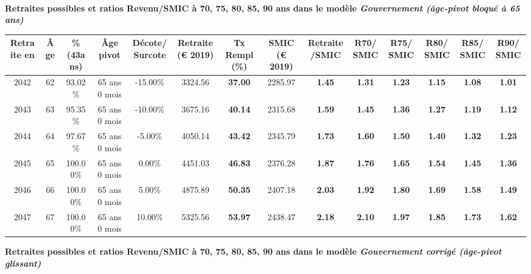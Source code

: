  ~\\{\bf \noindent Retraites possibles et ratios Revenu/SMIC à 70, 75, 80, 85, 90 ans dans le modèle \emph{Gouvernement (âge-pivot bloqué à 65 ans)}}  
 
\begin{adjustbox}{max width=\textwidth} 
\begin{tabular}[htb]{|c|c||c|c|c||c|c||c|c||c|c|c|c|c|} 
\hline 
 Retraite en &  Âge &  \%(43ans) &  Âge pivot &  Décote/Surcote &  Retraite (\euro{} 2019) &  Tx Rempl(\%) &  SMIC (\euro{} 2019) &  Retraite/SMIC &  R70/SMIC &  R75/SMIC &  R80/SMIC &  R85/SMIC &  R90/SMIC \\ 
\hline \hline 
 2042 &  62 &  93.02\% &  65 ans 0 mois &  -15.00\% &  3324.56 &  {\bf 37.00} &  2285.97 &  {\bf 1.45} &  {\bf 1.31} &  {\bf 1.23} &  {\bf 1.15} &  {\bf 1.08} &  {\bf 1.01} \\ 
\hline 
 2043 &  63 &  95.35\% &  65 ans 0 mois &  -10.00\% &  3675.16 &  {\bf 40.14} &  2315.68 &  {\bf 1.59} &  {\bf 1.45} &  {\bf 1.36} &  {\bf 1.27} &  {\bf 1.19} &  {\bf 1.12} \\ 
\hline 
 2044 &  64 &  97.67\% &  65 ans 0 mois &  -5.00\% &  4050.14 &  {\bf 43.42} &  2345.79 &  {\bf 1.73} &  {\bf 1.60} &  {\bf 1.50} &  {\bf 1.40} &  {\bf 1.32} &  {\bf 1.23} \\ 
\hline 
 2045 &  65 &  100.00\% &  65 ans 0 mois &  0.00\% &  4451.03 &  {\bf 46.83} &  2376.28 &  {\bf 1.87} &  {\bf 1.76} &  {\bf 1.65} &  {\bf 1.54} &  {\bf 1.45} &  {\bf 1.36} \\ 
\hline 
 2046 &  66 &  100.00\% &  65 ans 0 mois &  5.00\% &  4875.89 &  {\bf 50.35} &  2407.18 &  {\bf 2.03} &  {\bf 1.92} &  {\bf 1.80} &  {\bf 1.69} &  {\bf 1.58} &  {\bf 1.49} \\ 
\hline 
 2047 &  67 &  100.00\% &  65 ans 0 mois &  10.00\% &  5325.56 &  {\bf 53.97} &  2438.47 &  {\bf 2.18} &  {\bf 2.10} &  {\bf 1.97} &  {\bf 1.85} &  {\bf 1.73} &  {\bf 1.62} \\ 
\hline 
\hline 
\end{tabular} 
\end{adjustbox} 
 
 \vspace{0.1cm} 
{\bf \noindent Retraites possibles et ratios Revenu/SMIC à 70, 75, 80, 85, 90 ans dans le modèle \emph{Gouvernement corrigé (âge-pivot glissant)}}  
 

